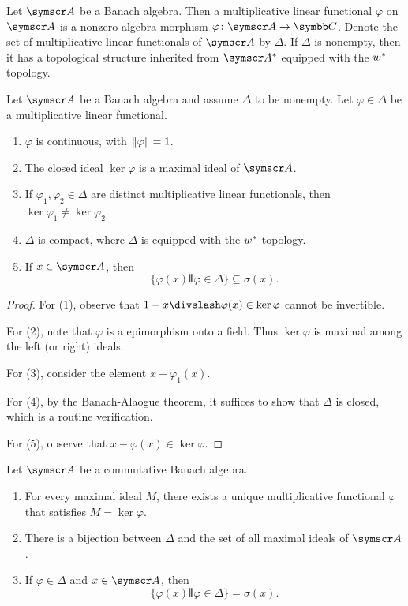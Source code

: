 \begin{definition}
  Let $\BA A$ be a Banach algebra. Then a multiplicative linear functional $\varphi$ on $\BA A$ is a nonzero algebra morphism $\varphi\colon\BA A\to \CC$. Denote the set of multiplicative linear functionals of $\BA A$ by $\Delta$. If $\Delta$ is nonempty, then it has a topological structure inherited from $\BA A^*$ equipped with the $w^*$ topology.
\end{definition}

\begin{proposition}
  Let $\BA A$ be a Banach algebra and assume $\Delta$ to be nonempty. Let $\varphi\in \Delta$ be a multiplicative linear functional.
  \begin{enumerate}
    \item $\varphi$ is continuous, with $\Vert\varphi\Vert=1$.
    \item The closed ideal $\ker\varphi$ is a maximal ideal of $\BA A$.
    \item If $\varphi_1, \varphi_2\in\Delta$ are distinct multiplicative linear functionals, then $\ker\varphi_1\neq \ker\varphi_2$.
    \item $\Delta$ is compact, where $\Delta$ is equipped with the $w^*$ topology.
    \item If $x\in\BA A$, then
    \begin{equation*}
      \{\varphi(x)\VERT \varphi\in\Delta\}\subseteq \sigma(x).
    \end{equation*}
  \end{enumerate}
\end{proposition}

\begin{proof}
  For (1), observe that $1-x\DIV \varphi(x)\in\ker\varphi$ cannot be invertible.

  For (2), note that $\varphi$ is a epimorphism onto a field. Thus $\ker\varphi$ is maximal among the left (or right) ideals.

  For (3), consider the element $x-\varphi_1(x)$.

  For (4), by the Banach-Alaogue theorem, it suffices to show that $\Delta$ is closed, which is a routine verification.

  For (5), observe that $x-\varphi(x)\in\ker\varphi$.
\end{proof}

\begin{proposition}
  Let $\BA A$ be a commutative Banach algebra.
  \begin{enumerate}
    \item For every maximal ideal $M$, there exists a unique multiplicative functional $\varphi$ that satisfies $M=\ker\varphi$.
    \item There is a bijection between $\Delta$ and the set of all maximal ideals of $\BA A$.
    \item If $\varphi\in\Delta$ and $x\in\BA A$, then
    \begin{equation*}
      \{\varphi(x)\VERT \varphi\in\Delta\}= \sigma(x).
    \end{equation*}
  \end{enumerate}
\end{proposition}


